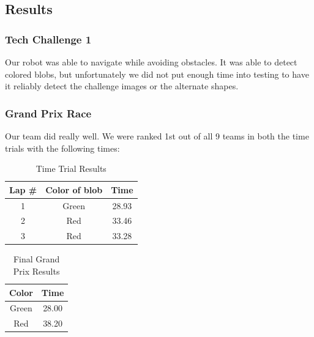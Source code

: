 \documentclass[journal, a4paper]{IEEEtran}
\begin{document}
\subsection{Results}
\subsubsection{Tech Challenge 1}
Our robot was able to navigate while avoiding obstacles. It was able to detect colored blobs, but unfortunately we did not put enough time into testing to have it reliably detect the challenge images or the alternate shapes.
\subsubsection{Grand Prix Race}
Our team did really well. We were ranked 1st out of all 9 teams in both the time trials with the following times:
    \begin{table}[!hbt]
        \begin{center}
        \caption{Time Trial Results}
        \begin{tabular}{|c|c|c|}
            \hline
			\textbf{Lap \#} & \textbf{Color of blob} & \textbf{Time} \\
			\hline
            1 & Green & 28.93\\
            \hline
            2 & Red & 33.46 \\
            \hline
            3 & Red & 33.28\\
            \hline
        \end{tabular}
        \end{center}
    \end{table}
    \begin{table}[!hbt]
        \begin{center}
		\caption{Final Grand Prix Results}
        \begin{tabular}{|c|c|}
            \hline
			\textbf{Color} & \textbf{Time} \\
			\hline
            Green & 28.00 \\
            \hline
            Red & 38.20 \\
            \hline
        \end{tabular}
        \end{center}
    \end{table}
\end{document}
